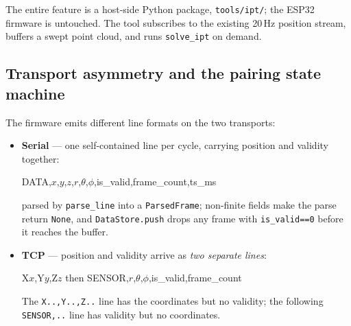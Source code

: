 \documentclass[11pt,a4paper]{article}
\newcommand{\bP}{\mathbf{P}}
\begin{document}
The entire feature is a host-side Python package, \texttt{tools/ipt/}; the ESP32
firmware is untouched. The tool subscribes to the existing 20\,Hz position stream,
buffers a swept point cloud, and runs \texttt{solve\_ipt} on demand.

\begin{center}
\end{center}

\subsection{Transport asymmetry and the pairing state machine}

The firmware emits different line formats on the two transports:
\begin{itemize}
\item \textbf{Serial} --- one self-contained line per cycle, carrying position and
  validity together:
  \begin{center}\ttfamily\footnotesize
  DATA,$x$,$y$,$z$,$r$,$\theta$,$\phi$,is\_valid,frame\_count,ts\_ms
  \end{center}
  parsed by \texttt{parse\_line} into a \texttt{ParsedFrame}; non-finite fields make
  the parse return \texttt{None}, and \texttt{DataStore.push} drops any frame with
  \texttt{is\_valid==0} before it reaches the buffer.
\item \textbf{TCP} --- position and validity arrive as \emph{two separate lines}:
  \begin{center}\ttfamily\footnotesize
  X$x$,Y$y$,Z$z$ \qquad then \qquad SENSOR,$r$,$\theta$,$\phi$,is\_valid,frame\_count
  \end{center}
  The \texttt{X..,Y..,Z..} line has the coordinates but no validity; the following
  \texttt{SENSOR,..} line has validity but no coordinates.
\end{itemize}
\end{document}
